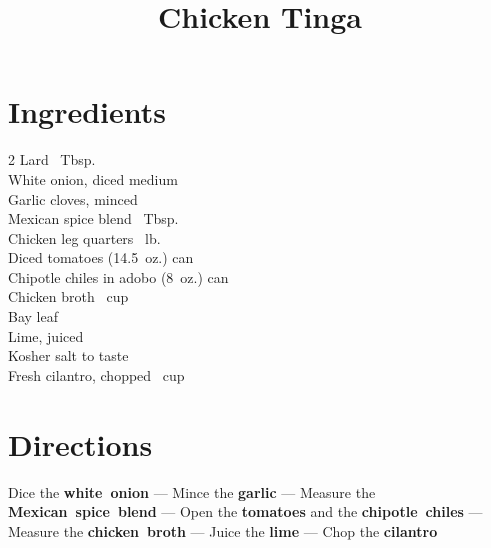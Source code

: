 \documentclass[11pt,letterpaper]{article}
\title{Chicken Tinga}
\author{}
\date{}
\begin{document}
\maketitle
\thispagestyle{empty}


\section*{Ingredients}
\setlength{\columnsep}{20pt}
\begin{multicols}{2}
\noindent
    Lard ~Tbsp. \\
    White onion, diced  medium \\
    Garlic cloves, minced  \\
    Mexican spice blend ~Tbsp. \\
    Chicken leg quarters ~lb. \\
    Diced tomatoes  (14.5~oz.) can \\
    \columnbreak
    Chipotle chiles in adobo  (8~oz.) can \\
    Chicken broth ~cup \\
    Bay leaf  \\
    Lime, juiced  \\
    Kosher salt \dotfill to taste \\
    Fresh cilantro, chopped \dotfill {}~cup \\
\end{multicols}

\section*{Directions}

\noindent
Dice the \textbf{white~onion} ---
Mince the \textbf{garlic} ---
Measure the \textbf{Mexican~spice~blend} ---
Open the \textbf{tomatoes} and the \textbf{chipotle~chiles} ---
Measure the \textbf{chicken~broth} ---
Juice the \textbf{lime} ---
Chop the \textbf{cilantro}
\end{document}

